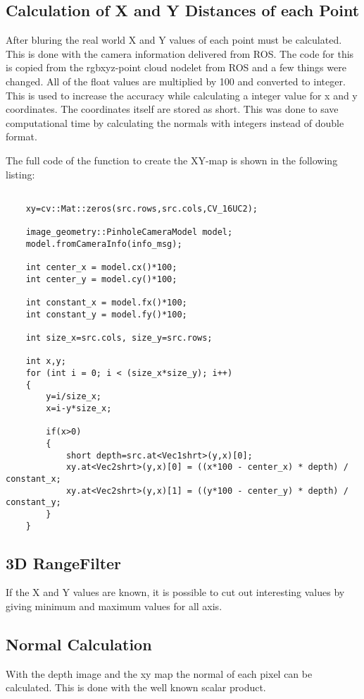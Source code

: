 \subsection{Calculation of X and Y Distances of each Point}
After bluring the real world X and Y values of each point must be calculated. This is done with the camera information delivered 
from ROS. The code for this is copied from the rgbxyz-point cloud nodelet from ROS and a few things were changed.
All of the float values are multiplied by 100 and converted to integer. This is used to increase the accuracy while
calculating a integer value for x and y coordinates. The coordinates itself are stored as short. This was done to save
computational time by calculating the normals with integers instead of double format.

The full code of the function to create the XY-map is shown in the following listing:
{
\tiny
\begin{lstlisting}

	xy=cv::Mat::zeros(src.rows,src.cols,CV_16UC2);

	image_geometry::PinholeCameraModel model;
	model.fromCameraInfo(info_msg);

	int center_x = model.cx()*100;					
	int center_y = model.cy()*100;					

	int constant_x = model.fx()*100;
	int constant_y = model.fy()*100;

	int size_x=src.cols, size_y=src.rows;

	int x,y;
	for (int i = 0; i < (size_x*size_y); i++)
	{
		y=i/size_x;
		x=i-y*size_x;

		if(x>0)
		{
			short depth=src.at<Vec1shrt>(y,x)[0];
			xy.at<Vec2shrt>(y,x)[0] = ((x*100 - center_x) * depth) / constant_x;
			xy.at<Vec2shrt>(y,x)[1] = ((y*100 - center_y) * depth) / constant_y;
		}
	}
\end{lstlisting}
}

\subsection{3D RangeFilter}
If the X and Y values are known, it is possible to cut out interesting values by giving minimum and maximum values for all axis.


\subsection{Normal Calculation}
With the depth image and the xy map the normal of each pixel can be calculated. This is done with the well known scalar product.


